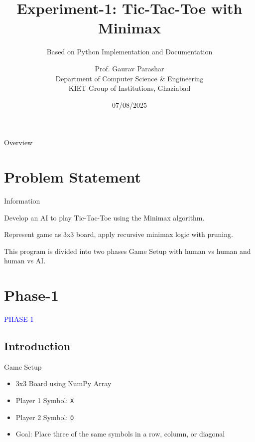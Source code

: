 \documentclass{beamer}
\title{Experiment-1: Tic-Tac-Toe with Minimax}
\subtitle{Based on Python Implementation and Documentation}
\author{Prof. Gaurav Parashar \\
Department of Computer Science \& Engineering \\
KIET Group of Institutions, Ghaziabad
}
\date{07/08/2025}
\begin{document}
\begin{frame}
  \titlepage
\end{frame}

\begin{frame}{Overview}
  \tableofcontents
\end{frame}


\section{Problem Statement}
\begin{frame}{Information}
\begin{tcolorbox}[colback=blue!5!white,colframe=blue!75!black,title=Problem Statement]
Develop an AI to play Tic-Tac-Toe using the Minimax algorithm.
\end{tcolorbox}

\begin{tcolorbox}[colback=yellow!5!white,colframe=yellow!50!black,
  colbacktitle=yellow!75!black,title=Implementation Details]
Represent game as 3x3 board, apply recursive minimax logic with pruning.
\end{tcolorbox}
\begin{tcolorbox}[colback=red!5!white,colframe=red!50!black,
  colbacktitle=red!75!black,title=Plan]
This program is divided into two phases Game Setup with human vs human and human vs AI.
\end{tcolorbox}
\end{frame}

\section{Phase-1}
\begin{frame}
\centering
\Huge \textcolor{blue}{PHASE-1}
\end{frame}



\subsection{Introduction}
\begin{frame}{Game Setup}
\begin{itemize}
  \item 3x3 Board using NumPy Array
  \item Player 1 Symbol: \texttt{X}
  \item Player 2 Symbol: \texttt{O}
  \item Goal: Place three of the same symbols in a row, column, or diagonal
\end{itemize}
\end{frame}
\end{document}
